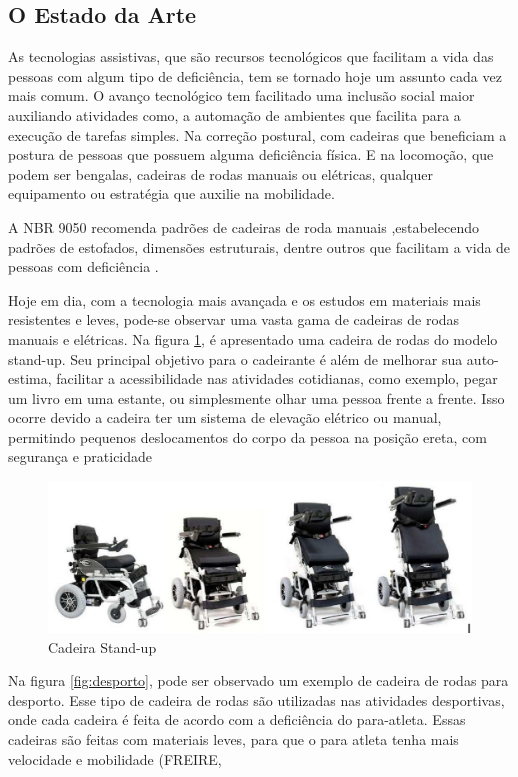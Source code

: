 \subsection{O Estado da Arte}

As tecnologias assistivas, que são recursos tecnológicos que facilitam a vida das pessoas com algum tipo de deficiência, tem se tornado hoje um assunto cada vez mais comum. O avanço tecnológico tem facilitado uma inclusão social maior auxiliando atividades como, a automação de ambientes que facilita para a execução de tarefas simples. Na correção postural, com cadeiras que beneficiam a postura de pessoas que possuem alguma deficiência física. E na locomoção, que podem ser bengalas, cadeiras de rodas manuais ou elétricas, qualquer equipamento ou estratégia que auxilie na mobilidade.

A NBR 9050 recomenda padrões de cadeiras de roda manuais ,estabelecendo padrões de estofados, dimensões estruturais, dentre outros que facilitam a vida de pessoas com deficiência \cite{becker}.

Hoje em dia, com a tecnologia mais avançada e os estudos em materiais mais resistentes e leves, pode-se observar uma vasta gama de cadeiras de rodas manuais e elétricas. Na figura \ref{fig:stand_up}, é apresentado uma cadeira de rodas do modelo stand-up. Seu principal objetivo para o cadeirante é além de melhorar sua auto-estima, facilitar a acessibilidade nas atividades cotidianas, como exemplo, pegar um livro em uma estante, ou simplesmente olhar uma pessoa frente a frente. Isso ocorre devido a cadeira ter um sistema de elevação elétrico ou manual, permitindo pequenos deslocamentos do corpo da pessoa na posição ereta, com segurança e praticidade

\begin{figure}[!htb]
  \centering
  \includegraphics[keepaspectratio=true,scale=0.50]{figuras/introducao/versoes}
  \caption{Cadeira Stand-up}
  \label{fig:stand_up}
\end{figure}


Na figura \ref{fig:desporto}, pode ser observado um exemplo de cadeira de rodas para desporto. Esse tipo de cadeira de rodas são utilizadas nas atividades desportivas, onde cada cadeira é feita de acordo com a deficiência do para-atleta. Essas cadeiras são feitas com materiais leves, para que o para atleta tenha mais velocidade e mobilidade (FREIRE,

